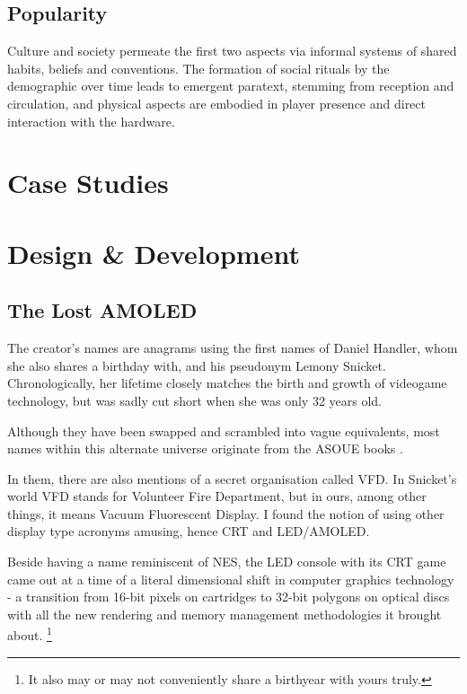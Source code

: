 \documentclass[12pt,oneside]{book}
\begin{document}
\section{Popularity}
Culture and society permeate the first two aspects via informal systems of shared habits, beliefs and conventions.
The formation of social rituals by the demographic over time leads to emergent paratext, stemming from reception and circulation, and physical aspects are embodied in player presence and direct interaction with the hardware.

\chapter{Case Studies}


\chapter{Design \& Development}\label{chap-4-dnd}

\section{The Lost AMOLED}
The creator's names are anagrams using the first names of Daniel Handler, whom she also shares a birthday with, and his pseudonym Lemony Snicket. Chronologically, her lifetime closely matches the birth and growth of videogame technology, but was sadly cut short when she was only 32 years old.\par
Although they have been swapped and scrambled into vague equivalents, most names within this alternate universe originate from the ASOUE books \parencite{asoue}.\par
In them, there are also mentions of a secret organisation called VFD. In Snicket's world VFD stands for Volunteer Fire Department, but in ours, among other things, it means Vacuum Fluorescent Display. I found the notion of using other display type acronyms amusing, hence CRT and LED/AMOLED.\par
Beside having a name reminiscent of NES, the LED console with its CRT game came out at a time of a literal dimensional shift in computer graphics technology - a transition from 16-bit pixels on cartridges to 32-bit polygons on optical discs with all the new rendering and memory management methodologies it brought about.
\footnote{It also may or may not conveniently share a birthyear with yours truly.}
\end{document}
